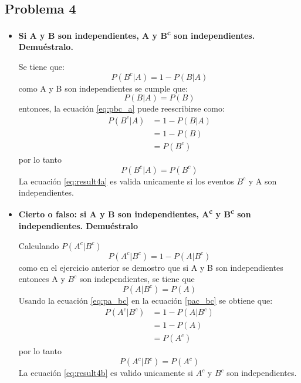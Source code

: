 \subsection*{Problema 4}
\begin{itemize}
    \item \textbf{Si A y B son independientes, A y B\textsuperscript{c} son independientes. Demuéstralo.}

          Se tiene que:
          \begin{equation}
              P(B^c|A)  =1-P(B|A)
              \label{eq:pbc_a}
          \end{equation}
          como A y B son independientes se cumple que:
          \begin{equation*}
              P(B|A)= P(B)
          \end{equation*}
          entonces, la ecuación \ref{eq:pbc_a} puede reescribirse como:
          \begin{align*}
              P(B^c|A) & =1-P(B|A) \\
                       & = 1- P(B) \\
                       & = P(B^c)
          \end{align*}
          por lo tanto
          \begin{equation}
              P(B^c|A) = P(B^c)
              \label{eq:result4a}
          \end{equation}
          La ecuación \ref{eq:result4a} es valida unicamente si los eventos $B^c$ y A son independientes.
    \item \textbf{Cierto o falso: si A y B son independientes, A\textsuperscript{c} y B\textsuperscript{c} son independientes. Demuéstralo}

          Calculando $P(A^c|B^c)$
          \begin{equation}
              P(A^c|B^c) = 1-P(A|B^c)
              \label{pac_bc}
          \end{equation}
          como en el ejercicio anterior se demostro que si A y B son independientes entonces A y $B^c$ son independientes, se tiene que
          \begin{equation}
              P(A|B^c) = P(A)
              \label{eq:pa_bc}
          \end{equation}
          Usando la ecuación \ref{eq:pa_bc} en la ecuación \ref{pac_bc} se obtiene que:
          \begin{align*}
              P(A^c|B^c) & = 1-P(A|B^c) \\
                         & = 1-P(A)     \\
                         & =P(A^c)
          \end{align*}
          por lo tanto
          \begin{equation}
              P(A^c|B^c)=P(A^c)
              \label{eq:result4b}
          \end{equation}
          La ecuación \ref{eq:result4b} es valido unicamente si $A^c$ y $B^c$ son independientes.
\end{itemize}